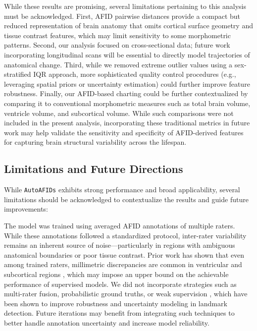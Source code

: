 While these results are promising, several limitations pertaining to this analysis must be acknowledged. First, AFID pairwise distances provide a compact but reduced representation of brain anatomy that omits cortical surface geometry and tissue contrast features, which may limit sensitivity to some morphometric patterns. Second, our analysis focused on cross-sectional data; future work incorporating longitudinal scans will be essential to directly model trajectories of anatomical change. Third, while we removed extreme outlier values using a sex-stratified IQR approach, more sophisticated quality control procedures (e.g., leveraging spatial priors or uncertainty estimation) could further improve feature robustness. Finally, our AFID-based charting could be further contextualized by comparing it to conventional morphometric measures such as total brain volume, ventricle volume, and subcortical volume. While such comparisons were not included in the present analysis, incorporating these traditional metrics in future work may help validate the sensitivity and specificity of AFID-derived features for capturing brain structural variability across the lifespan.

\subsection{Limitations and Future Directions}

While \texttt{AutoAFIDs} exhibits strong performance and broad applicability, several limitations should be acknowledged to contextualize the results and guide future improvements:

The model was trained using averaged AFID annotations of multiple raters. While these annotations followed a standardized protocol, inter-rater variability remains an inherent source of noise—particularly in regions with ambiguous anatomical boundaries or poor tissue contrast. Prior work has shown that even among trained raters, millimetric discrepancies are common in ventricular and subcortical regions \cite{Lau2019-eh,Abbass2022-lf}, which may impose an upper bound on the achievable performance of supervised models. We did not incorporate strategies such as multi-rater fusion, probabilistic ground truths, or weak supervision \cite{Salari2024-rw}, which have been shown to improve robustness and uncertainty modeling in landmark detection. Future iterations may benefit from integrating such techniques to better handle annotation uncertainty and increase model reliability.

